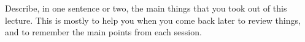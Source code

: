 \question
Describe, in one sentence or two, the main things that you took out of this
lecture. This is mostly to help you when you come back later to review things,
and to remember the main points from each session.

\makeemptybox{\fill}
